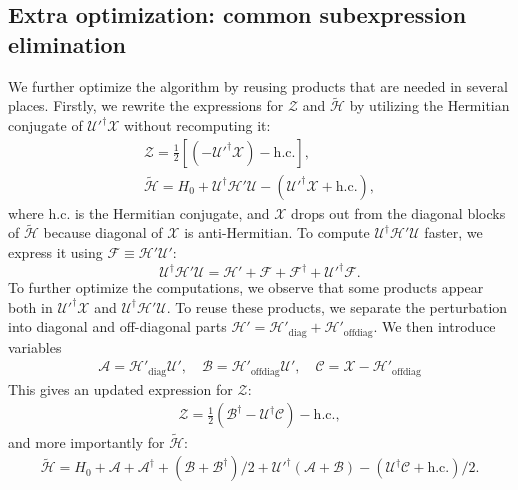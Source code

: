 \subsection{Extra optimization: common subexpression elimination}
%
We further optimize the algorithm by reusing products that are needed in several
places.
%
Firstly, we rewrite the expressions for $\mathcal{Z}$ and $\tilde{\mathcal{H}}$
by utilizing the Hermitian conjugate of $\mathcal{U}'^\dagger \mathcal{X}$ without recomputing it:
%
\begin{gather*}
\mathcal{Z} = \frac{1}{2}[(-\mathcal{U}'^\dagger \mathcal{X})- \textrm{h.c.}],\\
\tilde{\mathcal{H}} = H_0 + \mathcal{U}^\dagger \mathcal{H}' \mathcal{U} - (\mathcal{U}'^\dagger \mathcal{X} + \textrm{h.c.}),
\end{gather*}
%
where $\textrm{h.c.}$ is the Hermitian conjugate, and $\mathcal{X}$ drops out from the diagonal blocks of $\tilde{\mathcal{H}}$ because diagonal of $\mathcal{X}$ is anti-Hermitian.
%
To compute $\mathcal{U}^\dagger \mathcal{H}' \mathcal{U}$ faster, we express it
using $\mathcal{F} \equiv \mathcal{H}'\mathcal{U}'$:
%
$$
\mathcal{U}^\dagger \mathcal{H}' \mathcal{U} = \mathcal{H}' + \mathcal{F} + \mathcal{F}^\dagger + \mathcal{U}'^\dagger \mathcal{F}.
$$
%
To further optimize the computations, we observe that some products appear both in $\mathcal{U}'^\dagger \mathcal{X}$ and $\mathcal{U}^\dagger \mathcal{H}' \mathcal{U}$.
%
To reuse these products, we separate the perturbation into diagonal and off-diagonal parts $\mathcal{H}' = \mathcal{H}'_\textrm{diag} + \mathcal{H}'_\textrm{offdiag}$.
%
We then introduce variables
%
\begin{align}
\mathcal{A} = \mathcal{H}'_\textrm{diag} \mathcal{U}', \quad
\mathcal{B} = \mathcal{H}'_\textrm{offdiag} \mathcal{U}', \quad
\mathcal{C} = \mathcal{X} - \mathcal{H}'_\textrm{offdiag}
\end{align}
%
This gives an updated expression for $\mathcal{Z}$:
%
\begin{align}
\label{eq:Z_optimized}
\mathcal{Z} = \frac{1}{2}(\mathcal{B}^\dagger - \mathcal{U}^\dagger\mathcal{C}) - \textrm{h.c.},
\end{align}
%
and more importantly for $\tilde{\mathcal{H}}$:
%
\begin{align}
\label{eq:H_tilde_optimized}
\tilde{\mathcal{H}} = H_0 + \mathcal{A} + \mathcal{A}^\dagger + (\mathcal{B} + \mathcal{B}^\dagger)/2 + \mathcal{U}'^\dagger (\mathcal{A} + \mathcal{B}) - (\mathcal{U}^\dagger \mathcal{C} + \textrm{h.c.})/2.
\end{align}

